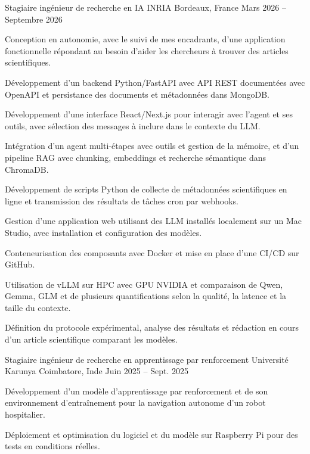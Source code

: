 
\begin{cventries}
  \cventry
    {Stagiaire ingénieur de recherche en IA}
    {INRIA}
    {Bordeaux, France}
    {Mars 2026 -- Septembre 2026}
    {
      \begin{cvitems}
        \item {Conception en autonomie, avec le suivi de mes encadrants, d’une application fonctionnelle répondant au besoin d’aider les chercheurs à trouver des articles scientifiques.}
        \item {Développement d’un backend Python/FastAPI avec API REST documentées avec OpenAPI et persistance des documents et métadonnées dans MongoDB.}
        \item {Développement d’une interface React/Next.js pour interagir avec l’agent et ses outils, avec sélection des messages à inclure dans le contexte du LLM.}
        \item {Intégration d’un agent multi-étapes avec outils et gestion de la mémoire, et d’un pipeline RAG avec chunking, embeddings et recherche sémantique dans ChromaDB.}
        \item {Développement de scripts Python de collecte de métadonnées scientifiques en ligne et transmission des résultats de tâches cron par webhooks.}
        \item {Gestion d’une application web utilisant des LLM installés localement sur un Mac Studio, avec installation et configuration des modèles.}
        \item {Conteneurisation des composants avec Docker et mise en place d’une CI/CD sur GitHub.}
        \item {Utilisation de vLLM sur HPC avec GPU NVIDIA et comparaison de Qwen, Gemma, GLM et de plusieurs quantifications selon la qualité, la latence et la taille du contexte.}
        \item {Définition du protocole expérimental, analyse des résultats et rédaction en cours d’un article scientifique comparant les modèles.}
      \end{cvitems}
    }

  \cventry
    {Stagiaire ingénieur de recherche en apprentissage par renforcement}
    {Université Karunya}
    {Coimbatore, Inde}
    {Juin 2025 -- Sept. 2025}
    {
      \begin{cvitems}
        \item {Développement d’un modèle d’apprentissage par renforcement et de son environnement d’entraînement pour la navigation autonome d’un robot hospitalier.}
        \item {Déploiement et optimisation du logiciel et du modèle sur Raspberry Pi pour des tests en conditions réelles.}
      \end{cvitems}
    }
\end{cventries}
